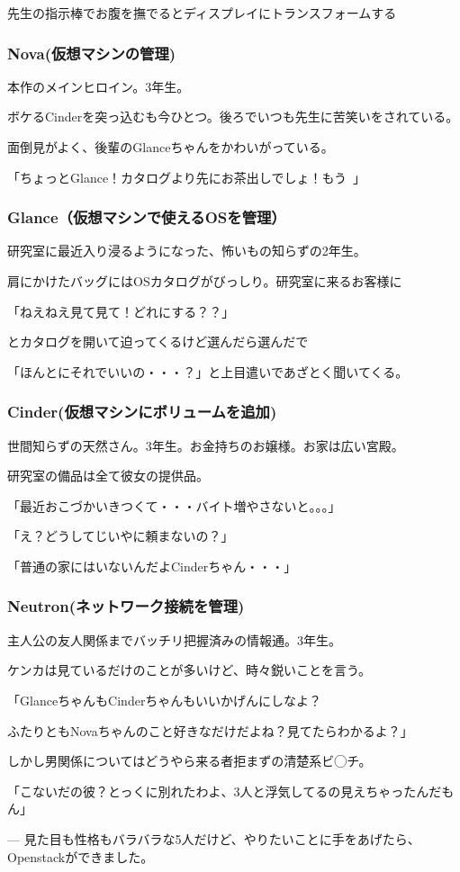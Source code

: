 \documentclass[9pt,b5paper,tombo,openany,dvipdfmx]{jsbook}
\begin{document}
\begin{minipage}{1.1\textwidth}
	先生の指示棒でお腹を撫でるとディスプレイにトランスフォームする

	\subsubsection{Nova(仮想マシンの管理)}

	本作のメインヒロイン。3年生。

	ボケるCinderを突っ込むも今ひとつ。後ろでいつも先生に苦笑いをされている。

	面倒見がよく、後輩のGlanceちゃんをかわいがっている。

	「ちょっとGlance！カタログより先にお茶出しでしょ！もう~」

	\subsubsection{Glance（仮想マシンで使えるOSを管理）}

	研究室に最近入り浸るようになった、怖いもの知らずの2年生。

	肩にかけたバッグにはOSカタログがびっしり。研究室に来るお客様に

	「ねえねえ見て見て！どれにする？？」

	とカタログを開いて迫ってくるけど選んだら選んだで

	「ほんとにそれでいいの・・・？」と上目遣いであざとく聞いてくる。

	\subsubsection{Cinder(仮想マシンにボリュームを追加)}

	世間知らずの天然さん。3年生。お金持ちのお嬢様。お家は広い宮殿。

	研究室の備品は全て彼女の提供品。

	「最近おこづかいきつくて・・・バイト増やさないと。。。」

	「え？どうしてじいやに頼まないの？」

	「普通の家にはいないんだよCinderちゃん・・・」

	\subsubsection{Neutron(ネットワーク接続を管理)}

	主人公の友人関係までバッチリ把握済みの情報通。3年生。

	ケンカは見ているだけのことが多いけど、時々鋭いことを言う。

	「GlanceちゃんもCinderちゃんもいいかげんにしなよ？

	ふたりともNovaちゃんのこと好きなだけだよね？見てたらわかるよ？」

	しかし男関係についてはどうやら来る者拒まずの清楚系ビ◯チ。

	「こないだの彼？とっくに別れたわよ、3人と浮気してるの見えちゃったんだもん」

	--- 見た目も性格もバラバラな5人だけど、やりたいことに手をあげたら、Openstackができました。

\end{minipage}
\end{document}
